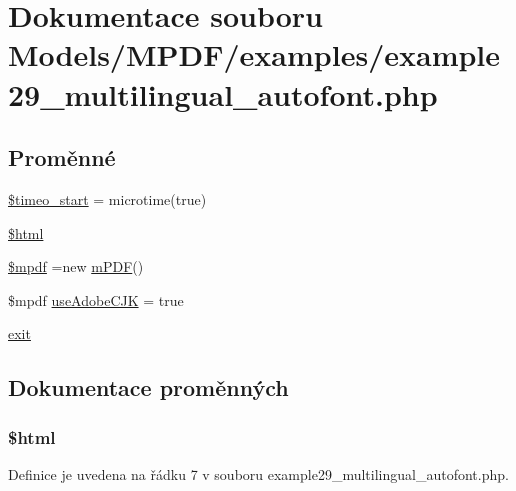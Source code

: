 \hypertarget{example29__multilingual__autofont_8php}{\section{Dokumentace souboru Models/\-M\-P\-D\-F/examples/example29\-\_\-multilingual\-\_\-autofont.php}
\label{example29__multilingual__autofont_8php}
}
\subsection*{Proměnné}
\begin{DoxyCompactItemize}
\item 
\hyperlink{example29__multilingual__autofont_8php_a06f35b7921fa102646070c194d147feb}{\$timeo\-\_\-start} = microtime(true)
\item 
\hyperlink{example29__multilingual__autofont_8php_a6f96e7fc92441776c9d1cd3386663b40}{\$html}
\item 
\hyperlink{example29__multilingual__autofont_8php_ad028f81910d6cbab9b184d2214b3a8f8}{\$mpdf} =new \hyperlink{classm_p_d_f}{m\-P\-D\-F}()
\item 
\$mpdf \hyperlink{example29__multilingual__autofont_8php_a9986e85eaef973df9d3fea85016c75a7}{use\-Adobe\-C\-J\-K} = true
\item 
\hyperlink{example29__multilingual__autofont_8php_a6733eb5f605d09eaede9845835d71c4e}{exit}
\end{DoxyCompactItemize}


\subsection{Dokumentace proměnných}
\hypertarget{example29__multilingual__autofont_8php_a6f96e7fc92441776c9d1cd3386663b40}{
\subsubsection[{\$html}]{\setlength{\rightskip}{0pt plus 5cm}\$html}}\label{example29__multilingual__autofont_8php_a6f96e7fc92441776c9d1cd3386663b40}


Definice je uvedena na řádku 7 v souboru example29\-\_\-multilingual\-\_\-autofont.\-php.

